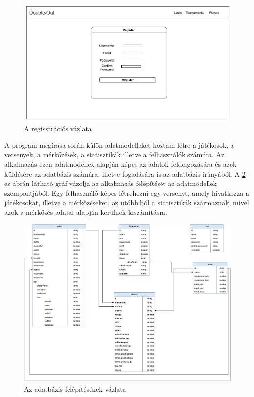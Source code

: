 \begin{figure}[h]
\centering
\includegraphics[scale=0.4]{images/Register.png}
\caption{A regisztrációs vázlata}
\label{fig:register}
\end{figure}

A program megírása során külön adatmodelleket hoztam létre a játékosok, a versenyek, a mérkőzések, a statisztikák illetve a felhasználók számára. Az alkalmazás ezen adatmodellek alapján képes az adatok feldolgozására és azok küldésére az adatbázis számára, illetve fogadására is az adatbázis irányából. A \ref{fig:graph} -es ábrán látható gráf vázolja az alkalmazás felépítését az adatmodellek szempontjából. Egy felhasználó képes létrehozni egy versenyt, amely hivatkozza a játékosokat, illetve a mérkőzéseket, az utóbbiból a statisztikák származnak, mivel azok a mérkőzés adatai alapján kerülnek kiszámításra.

\begin{figure}[h]
\centering
\includegraphics[scale=0.3]{images/Graph.png}
\caption{Az adatbázis felépítésének vázlata}
\label{fig:graph}
\end{figure}

